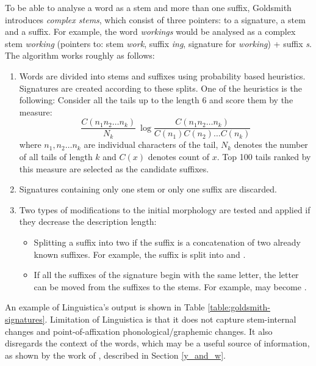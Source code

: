 To be able to analyse a word as a stem and more than one suffix, Goldsmith introduces \emph{complex stems}, which consist of three pointers: to a signature, a stem and a suffix. For example, the word \emph{workings} would be analysed as a complex stem \emph{working} (pointers to: stem \emph{work}, suffix \emph{ing}, signature for \emph{working}) + suffix \emph{s}. The algorithm works roughly as follows:
\begin{enumerate}
\item Words are divided into stems and suffixes using probability based heuristics. Signatures are created according to these splits. One of the heuristics is the following: Consider all the tails up to the length 6 and score them by the measure:
\[\frac{C(n_1n_2 \dots n_k)}{N_k} ~ \log \frac{C(n_1n_2 \dots n_k)}{C(n_1) C(n_2) \dots C(n_k)}\]
where $n_1,n_2 \dots n_k$ are individual characters of the tail, $N_k$ denotes the number of all tails of length $k$ and $C(x)$ denotes count of $x$. Top 100 tails ranked by this measure are selected as the candidate suffixes.
\item Signatures containing only one stem or only one suffix are discarded. 
\item Two types of modifications to the initial morphology are tested and applied if they decrease the description length:
\begin{itemize}
\item Splitting a suffix into two if the suffix is a concatenation of two already known suffixes. For example, the suffix  is split into  and .
\item If all the suffixes of the signature begin with the same letter, the letter can be moved from the suffixes to the stems. For example,  may become .
\end{itemize} 
\end{enumerate} 

An example of Linguistica's output is shown in Table \ref{table:goldsmith-signatures}. Limitation of Linguistica is that it does not capture stem-internal changes and point-of-affixation phonological/graphemic changes. It also disregards the context of the words, which may be a useful source of information, as shown by the work of \cite{yarowsky00}, described in Section \ref{y_and_w}.

